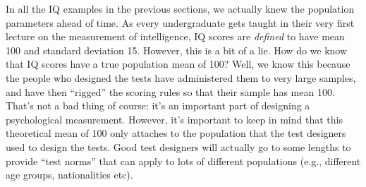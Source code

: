 \documentclass[
]{book}
\begin{document}
In all the IQ examples in the previous sections, we actually knew the population parameters ahead of time. As every undergraduate gets taught in their very first lecture on the measurement of intelligence, IQ scores are \emph{defined} to have mean 100 and standard deviation 15. However, this is a bit of a lie. How do we know that IQ scores have a true population mean of 100? Well, we know this because the people who designed the tests have administered them to very large samples, and have then ``rigged'' the scoring rules so that their sample has mean 100. That's not a bad thing of course: it's an important part of designing a psychological measurement. However, it's important to keep in mind that this theoretical mean of 100 only attaches to the population that the test designers used to design the tests. Good test designers will actually go to some lengths to provide ``test norms'' that can apply to lots of different populations (e.g., different age groups, nationalities etc).
\end{document}
